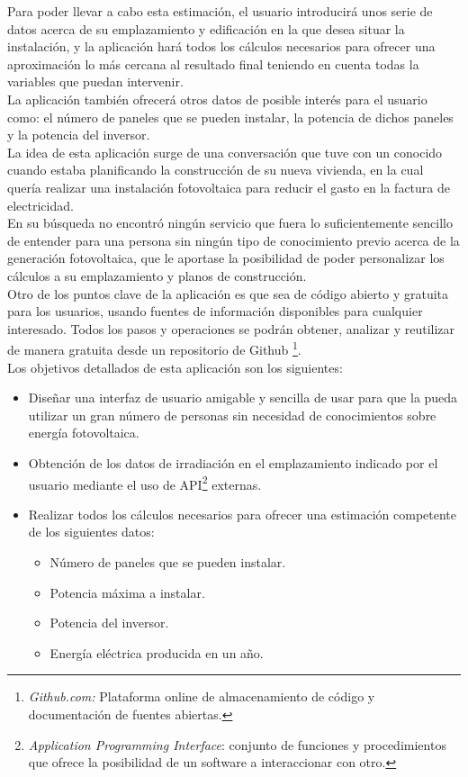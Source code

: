 \documentclass[11pt]{report}
\begin{document}
Para poder llevar a cabo esta estimación, el usuario introducirá unos serie de datos acerca de su emplazamiento y edificación en la que desea situar la instalación, y la aplicación hará todos los cálculos necesarios para ofrecer una aproximación lo más cercana al resultado final teniendo en cuenta todas la variables que puedan intervenir.\\

La aplicación también ofrecerá otros datos de posible interés para el usuario como: el número de paneles que se pueden instalar, la potencia de dichos paneles y la potencia del inversor.\\

La idea de esta aplicación surge de una conversación que tuve con un conocido cuando estaba planificando la construcción de su nueva vivienda, en la cual quería realizar una instalación fotovoltaica para reducir el gasto en la factura de electricidad.\\

En su búsqueda no encontró ningún servicio que fuera lo suficientemente sencillo de entender para una persona sin ningún tipo de conocimiento previo acerca de la generación fotovoltaica, que le aportase la posibilidad de poder personalizar los cálculos a su emplazamiento y planos de construcción.\\

Otro de los puntos clave de la aplicación es que sea de código abierto y gratuita para los usuarios, usando fuentes de información disponibles para cualquier interesado. Todos los pasos y operaciones se podrán obtener, analizar y reutilizar de manera gratuita desde un repositorio de Github \footnote{\textit{Github.com:} Plataforma online de almacenamiento de código y documentación de fuentes abiertas.}.\\


Los objetivos detallados de esta aplicación son los siguientes:
\begin{itemize}
\item Diseñar una interfaz de usuario amigable y sencilla de usar para que la pueda utilizar un gran número de personas sin necesidad de conocimientos sobre energía fotovoltaica.

\item Obtención de los datos de irradiación en el emplazamiento indicado por el usuario mediante el uso de API\footnote{\textit{Application Programming Interface}: conjunto de funciones y procedimientos que ofrece la posibilidad de un software a interaccionar con otro.} externas.
\item Realizar todos los cálculos necesarios para ofrecer una estimación competente de los siguientes datos:

\begin{itemize}

\item Número de paneles que se pueden instalar.
\item Potencia máxima a instalar.
\item Potencia del inversor.
\item Energía eléctrica producida en un año.

\end{itemize}
\end{itemize}
\end{document}

